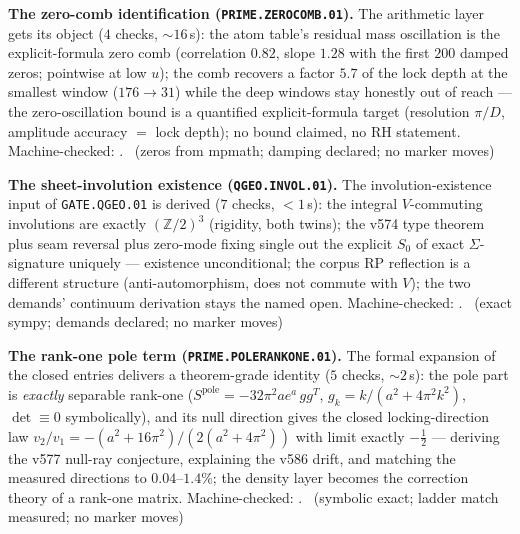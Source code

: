\documentclass[11pt,a4paper]{article}
\theoremstyle{definition}
\begin{document}
\par\smallskip\noindent\textbf{The zero-comb identification
(\texttt{PRIME.ZEROCOMB.01}).}
The arithmetic layer gets its object ($4$ checks, ${\sim}16$\,s): the
atom table's residual mass oscillation is the explicit-formula zero
comb (correlation $0.82$, slope $1.28$ with the first $200$ damped
zeros; pointwise at low $u$); the comb recovers a factor $5.7$ of the
lock depth at the smallest window ($176\to31$) while the deep windows
stay honestly out of reach --- the zero-oscillation bound is a
quantified explicit-formula target (resolution $\pi/D$, amplitude
accuracy $=$ lock depth); no bound claimed, no RH statement.
Machine-checked: .
\mE\ (zeros from mpmath; damping declared; no marker moves)
\par\smallskip

\par\smallskip\noindent\textbf{The sheet-involution existence
(\texttt{QGEO.INVOL.01}).}
The involution-existence input of \texttt{GATE.QGEO.01} is derived
($7$ checks, $<1$\,s): the integral $V$-commuting involutions are
exactly $(\mathbb{Z}/2)^3$ (rigidity, both twins); the v574 type
theorem plus seam reversal plus zero-mode fixing single out the
explicit $S_0$ of exact $\Sigma$-signature uniquely --- existence
unconditional; the corpus RP reflection is a different structure
(anti-automorphism, does not commute with $V$); the two demands'
continuum derivation stays the named open. Machine-checked:
.
\mE\ (exact sympy; demands declared; no marker moves)
\par\smallskip

\par\smallskip\noindent\textbf{The rank-one pole term
(\texttt{PRIME.POLERANKONE.01}).}
The formal expansion of the closed entries delivers a theorem-grade
identity ($5$ checks, ${\sim}2$\,s): the pole part is \emph{exactly}
separable rank-one ($S^{\mathrm{pole}}=-32\pi^2ae^a\,gg^T$,
$g_k=k/(a^2+4\pi^2k^2)$, $\det\equiv0$ symbolically), and its null
direction gives the closed locking-direction law
$v_2/v_1=-(a^2+16\pi^2)/(2(a^2+4\pi^2))$ with limit exactly
$-\tfrac12$ --- deriving the v577 null-ray conjecture, explaining the
v586 drift, and matching the measured directions to $0.04$--$1.4\%$;
the density layer becomes the correction theory of a rank-one matrix.
Machine-checked: .
\mE\ (symbolic exact; ladder match measured; no marker moves)
\par\smallskip
\end{document}
